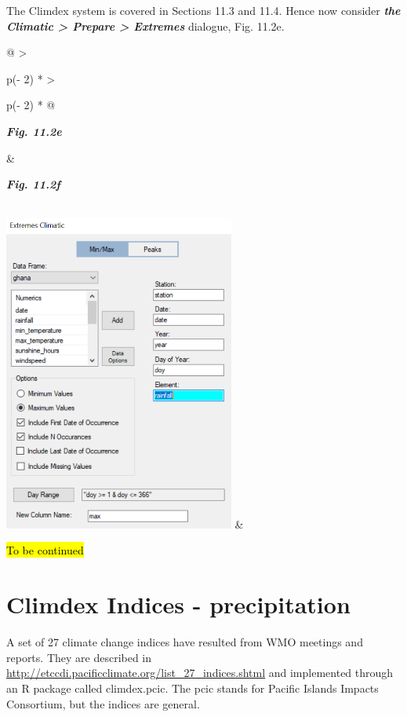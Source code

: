 \documentclass[
  letterpaper,
  DIV=11,
  numbers=noendperiod]{scrreprt}
\begin{document}
The Climdex system is covered in Sections 11.3 and 11.4. Hence now
consider \textbf{\emph{the Climatic \textgreater{} Prepare
\textgreater{} Extremes}} dialogue, Fig. 11.2e.

\begin{longtable}[]{@{}
  >{\raggedright\arraybackslash}p{(\columnwidth - 2\tabcolsep) * }
  >{\raggedright\arraybackslash}p{(\columnwidth - 2\tabcolsep) * }@{}}
\toprule\noalign{}
\begin{minipage}[b]{\linewidth}\raggedright
\textbf{\emph{Fig. 11.2e}}
\end{minipage} & \begin{minipage}[b]{\linewidth}\raggedright
\textbf{\emph{Fig. 11.2f}}
\end{minipage} \\
\midrule\noalign{}
\endhead
\bottomrule\noalign{}
\endlastfoot
\includegraphics[width=2.98703in,height=4.10977in]{figures/Fig11.2e.png}
& \\
\end{longtable}

\hl{To be continued}

\section{Climdex Indices -
precipitation}\label{climdex-indices---precipitation}

A set of 27 climate change indices have resulted from WMO meetings and
reports. They are described in
\href{http://etccdi.pacificclimate.org/list_27_indices.shtml}{\ul{http://etccdi.pacificclimate.org/list\_27\_indices.shtml}}
and implemented through an R package called climdex.pcic. The pcic
stands for Pacific Islands Impacts Consortium, but the indices are
general.
\end{document}
